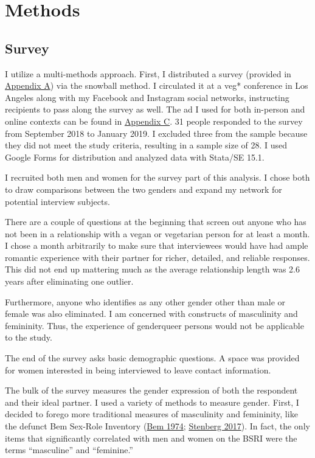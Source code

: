 \documentclass[twoside]{report}
\let\oldsection\section
\renewcommand\section{\clearpage\oldsection}
\begin{document}
\section{Methods}

\subsection{Survey}

I utilize a multi-methods approach. First, I distributed a survey (provided in \hyperlink{appendix-a}{Appendix A}) via the snowball method. I circulated it at a veg* conference in Los Angeles along with my Facebook and Instagram social networks, instructing recipients to pass along the survey as well. The ad I used for both in-person and online contexts can be found in \hyperlink{appendix-c}{Appendix C}. 31 people responded to the survey from September 2018 to January 2019. I excluded three from the sample because they did not meet the study criteria, resulting in a sample size of 28. I used Google Forms for distribution and analyzed data with Stata/SE 15.1.

I recruited both men and women for the survey part of this analysis. I chose both to draw comparisons between the two genders and expand my network for potential interview subjects.

There are a couple of questions at the beginning that screen out anyone who has not been in a relationship with a vegan or vegetarian person for at least a month. I chose a month arbitrarily to make sure that interviewees would have had ample romantic experience with their partner for richer, detailed, and reliable responses. This did not end up mattering much as the average relationship length was 2.6 years after eliminating one outlier.

Furthermore, anyone who identifies as any other gender other than male or female was also eliminated. I am concerned with constructs of masculinity and femininity. Thus, the experience of genderqueer persons would not be applicable to the study.

The end of the survey asks basic demographic questions. A space was provided for women interested in being interviewed to leave contact information.

The bulk of the survey measures the gender expression of both the respondent and their ideal partner. I used a variety of methods to measure gender. First, I decided to forego more traditional measures of masculinity and femininity, like the defunct Bem Sex-Role Inventory (\hyperlink{bem}{Bem 1974}; \hyperlink{stenberg}{Stenberg 2017}). In fact, the only items that significantly correlated with men and women on the BSRI were the terms ``masculine'' and ``feminine.''
\end{document}
